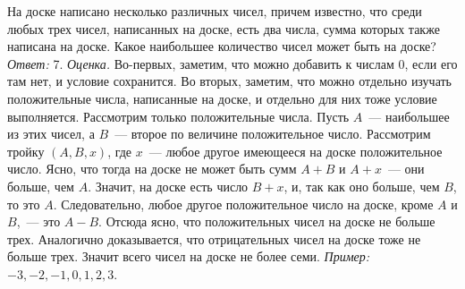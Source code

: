 \problem{}
На доске написано несколько различных чисел, причем известно, что среди любых
трех чисел, написанных на доске, есть два числа, сумма которых также написана
на доске.
Какое наибольшее количество чисел может быть на доске?
\solution
\emph{Ответ:} 7.
\emph{Оценка.}
Во-первых, заметим, что можно добавить к числам 0, если его там нет,
и условие сохранится.
Во вторых, заметим, что можно отдельно изучать положительные числа,
написанные на доске, и отдельно для них тоже условие выполняется.
Рассмотрим только положительные числа.
Пусть $A$~--- наибольшее из этих чисел, а $B$~--- второе по величине
положительное число.
Рассмотрим тройку $(A, B, x)$, где $x$~--- любое другое имеющееся на доске
положительное число.
Ясно, что тогда на доске не может быть сумм $A + B$ и $A + x$~--- они больше,
чем $A$.
Значит, на доске есть число $B + x$, и, так как оно больше, чем $B$, то это
$A$.
Следовательно, любое другое положительное число на доске, кроме $A$ и $B$,~---
это $A - B$.
Отсюда ясно, что положительных чисел на доске не больше трех.
Аналогично доказывается, что отрицательных чисел на доске тоже не больше трех.
Значит всего чисел на доске не более семи.
\emph{Пример:} $-3, -2, -1, 0, 1, 2, 3$.
\endproblem

